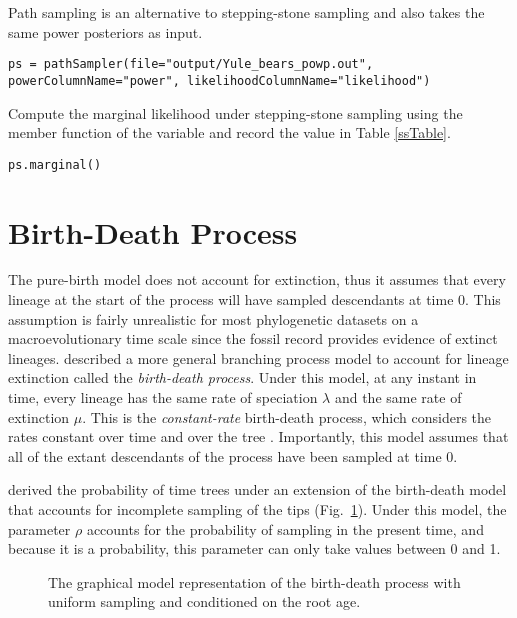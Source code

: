 Path sampling is an alternative to stepping-stone sampling and also takes the same power posteriors as input. 
{\tt \small \begin{snugshade*}
\begin{lstlisting}
ps = pathSampler(file="output/Yule_bears_powp.out", powerColumnName="power", likelihoodColumnName="likelihood")
\end{lstlisting}
\end{snugshade*}}

Compute the marginal likelihood under stepping-stone sampling using the member function  of the  variable and record the value in Table \ref{ssTable}.
{\tt \begin{snugshade*}
\begin{lstlisting}
ps.marginal() 
\end{lstlisting}
\end{snugshade*}}

\bigskip
\section{Birth-Death Process}\label{birthDeathSec}

The pure-birth model does not account for  extinction, thus it assumes that every lineage at the start of the process will have sampled descendants at time 0.
This assumption is fairly unrealistic for most phylogenetic datasets on a macroevolutionary time scale since the fossil record provides evidence of extinct lineages.
\citet{kendall48} described a more general branching process model to account for lineage extinction called the \textit{birth-death process}.
Under this model, at any instant in time, every lineage has the same rate of speciation $\lambda$ and the same rate of extinction $\mu$.
This is the \textit{constant-rate} birth-death process, which considers the rates constant over time and over the tree \citep{nee94}.
Importantly, this model assumes that all of the extant descendants of the process have been sampled at time 0.

\citet{yang97b} derived the probability of time trees under an extension of the birth-death model that accounts for incomplete sampling of the tips (Fig.~\ref{bdrGMFig1}). 
Under this model, the parameter $\rho$ accounts for the probability of sampling in the present time, and because it is a probability, this parameter can only take values between 0 and 1. 
\begin{figure}[h!]
\centering
{}
\caption{\small The graphical model representation of the birth-death process with uniform sampling and conditioned on the root age.}
\label{bdrGMFig1}
\end{figure}

